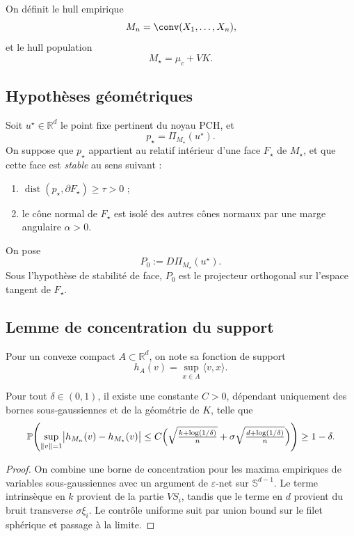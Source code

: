 On définit le hull empirique
\[
M_n=\conv(X_1,\dots,X_n),
\]
et le hull population
\[
M_\star=\mu_c+VK.
\]

\subsection{Hypothèses géométriques}

Soit \(u^\star\in\mathbb R^d\) le point fixe pertinent du noyau PCH, et
\[
p_\star=\Pi_{M_\star}(u^\star).
\]
On suppose que \(p_\star\) appartient au relatif intérieur d'une face \(F_\star\) de \(M_\star\), et que cette face est \emph{stable} au sens suivant :

\begin{enumerate}
    \item \(\operatorname{dist}(p_\star,\partial F_\star)\ge \tau>0\) ;
    \item le cône normal de \(F_\star\) est isolé des autres cônes normaux par une marge angulaire \(\alpha>0\).
\end{enumerate}

On pose
\[
P_0 := D\Pi_{M_\star}(u^\star).
\]
Sous l'hypothèse de stabilité de face, \(P_0\) est le projecteur orthogonal sur l'espace tangent de \(F_\star\).

\subsection{Lemme de concentration du support}

Pour un convexe compact \(A\subset\mathbb R^d\), on note sa fonction de support
\[
h_A(v)=\sup_{x\in A}\langle v,x\rangle.
\]

\begin{lemma}
Pour tout \(\delta\in(0,1)\), il existe une constante \(C>0\), dépendant uniquement des bornes sous-gaussiennes et de la géométrie de \(K\), telle que
\[
\mathbb P\!\left(
\sup_{\|v\|=1}\bigl|h_{M_n}(v)-h_{M_\star}(v)\bigr|
\le
C\Bigl(
\sqrt{\tfrac{k+\log(1/\delta)}{n}}
+
\sigma\sqrt{\tfrac{d+\log(1/\delta)}{n}}
\Bigr)
\right)\ge 1-\delta.
\]
\end{lemma}

\begin{proof}
On combine une borne de concentration pour les maxima empiriques de variables sous-gaussiennes avec un argument de \(\varepsilon\)-net sur \(\mathbb S^{d-1}\). Le terme intrinsèque en \(k\) provient de la partie \(V S_i\), tandis que le terme en \(d\) provient du bruit transverse \(\sigma\xi_i\). Le contrôle uniforme suit par union bound sur le filet sphérique et passage à la limite.
\end{proof}

